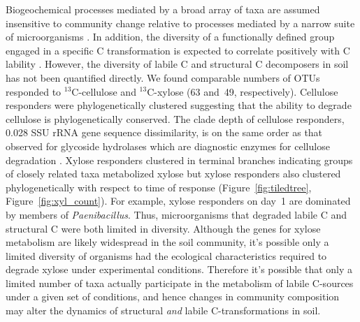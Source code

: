 Biogeochemical processes mediated by a broad array of taxa are assumed
insensitive to community change relative to
processes mediated by a narrow suite of microorganisms
\citep{Schimel_1995,McGuire2010}. In addition, the diversity of
a functionally defined group engaged in a specific C transformation is
expected to correlate positively with C lability \citep{McGuire2010}.
However, the diversity of labile C and structural C decomposers in soil
has not been quantified directly. We found comparable numbers of OTUs
responded to $^{13}$C-cellulose and $^{13}$C-xylose (63 and~49,
respectively). Cellulose responders were phylogenetically clustered
suggesting that the ability to degrade cellulose is phylogenetically
conserved. The clade depth of cellulose responders, 0.028 SSU rRNA gene
sequence dissimilarity, is on the same order as that observed for
glycoside hydrolases which are diagnostic enzymes for cellulose
degradation \citep{Berlemont2013}. Xylose responders clustered in terminal
branches indicating groups of closely related taxa metabolized xylose but
xylose responders also clustered phylogenetically with respect to time of
response (Figure~\ref{fig:tiledtree}, Figure~\ref{fig:xyl_count}).
For example, xylose responders on day~1 are dominated by members of
\textit{Paenibacillus}. Thus, microorganisms that degraded labile C and
structural C were both limited in diversity. Although the genes for xylose
metabolism are likely widespread in the soil community, it's possible only
a limited diversity of organisms had the ecological characteristics
required to degrade xylose under experimental conditions. Therefore it's
possible that only a limited number of taxa actually participate in the
metabolism of labile C-sources under a given set of conditions, and hence
changes in community composition may alter the dynamics of structural
\textit{and} labile C-transformations in soil.

